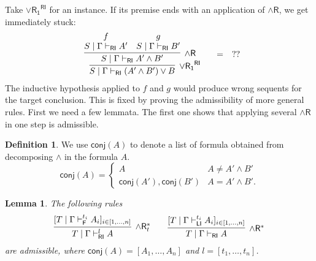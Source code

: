 \documentclass[submission,copyright,creativecommons]{eptcs}
\newtheorem{lemma}[theorem]{Lemma}
\theoremstyle{definition}
\newtheorem{defn}{Definition}[section]
\newcommand{\andr}{\land \mathsf{R}}
\newcommand{\orrone}{\lor \mathsf{R_{1}}}
\newcommand{\RI}{\mathsf{RI}}
\newcommand{\LI}{\mathsf{LI}}
\newcommand{\F}{\mathsf{F}}
\newcommand{\conj}[1]{\mathsf{conj} (#1)}
\newcommand{\proofbox}[1]{\begin{tabular}{l} #1 \end{tabular}}
\newcommand\niccolo[1]{\mbox{}
{\marginpar{\color{red}NV}}
{\sf\noindent\color{red}#1}}%
\begin{document}
Take $\orrone^{\RI}$ for an instance. If its premise ends with an application of $\andr$, we get immediately stuck:
\begin{displaymath}
  \begin{array}{c}
    \proofbox{
    \infer[\orrone^{\RI}]{S \mid \Gamma \vdash_{\RI} (A' \land B') \lor B}{
      \infer[\andr]{S \mid \Gamma \vdash_{\RI} A' \land B'}{
        \deduce{S \mid \Gamma \vdash_{\RI} A'}{f}
        &
        \deduce{S \mid \Gamma \vdash_{\RI} B'}{g}
      }
    }
    }
    \quad
    =
    \quad
    ??
  \end{array}
\end{displaymath}
The inductive hypothesis applied to $f$ and $g$ would produce wrong sequents for the target conclusion.
This is fixed by proving the admissibility of more general rules. First we need a few lemmata. 
The first one shows that applying several $\andr$ in one step is admissible.
\begin{defn}
  We use $\conj{A}$ to denote a list of formula obtained from decomposing $\land$ in the formula $A$.
  \begin{displaymath}
    \conj{A} = 
    \begin{cases}
      A & A \neq A' \land B'
      \\
      \conj{A'} , \conj{B'} & A = A' \land B'.
    \end{cases}
  \end{displaymath}
\end{defn}
\begin{lemma}\label{lem:BigStep}
  The following rules
  \begin{displaymath}
    \infer[\andr^{*}_t]{T \mid \Gamma \vdash^{l}_{\RI} A}{
      [T \mid \Gamma \vdash^{t_i}_{\F} A_i]_{i \in [1 , \dots , n]}
    }
    \qquad
    \infer[\andr^{*}]{T \mid \Gamma \vdash_{\RI} A}{
      [T \mid \Gamma \vdash^{t_i}_{\LI} A_i]_{i \in [1 , \dots , n]}
    }
  \end{displaymath}
  are admissible, where $\conj{A} = [A_1 , \dots , A_n]$ and $l = [t_1 , \dots , t_n]$.
\end{lemma}
\end{document}
